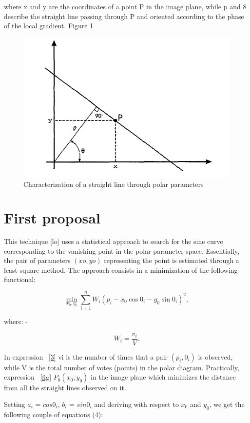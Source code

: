 \documentclass[12pt]{article}
\begin{document}
\raggedright where x and y are the coordinates of a point P in the image plane, while p and 8 describe the straight line passing through P and oriented according to the phase of the local gradient. Figure 
\ref{label1}
\noindent

\begin{figure}
    \centering
    \includegraphics[width=0.75\linewidth]{image1.png}
    \caption{Characterization of a straight line through polar parameters}
    \label{label1}
\end{figure}



\newpage
\section {First proposal}

\raggedright This technique [lo] uses a statistical approach to search for the sine curve corresponding to the vanishing point in the polar parameter space. Essentially, the pair of parameters $(xo, yo)$ representing the point is estimated through a least square method. The approach consists in a minimization of the following functional:
\noindent

\begin{equation}\label{fig}
\min_{x_0,y_0} ⁡\sum^n_{i=1} W_i  (p_i-x_0  \cos⁡0_i-y_0  \sin⁡{0_i})^2,
\end{equation}

\raggedright where:
\noindent
-

\begin{equation}\label{3}
W_i=\frac{v_i}{V}.
\end{equation}

\raggedright In expression ~\eqref{3} vi is the number of times that a pair $(p_i,0_i)$ is observed, while V is the total number of votes (points) in the polar diagram. Practically, expression  ~\eqref{fig} $P_0(x_0, y_0)$ in the image plane which minimizes the distance from all the straight lines observed on it.
\noindent
\newline
\raggedright Setting $a_i$ = $cos⁡{0_i}$, $b_i$ = $sin{0_i}$ and deriving with respect to $x_0$ and $y_0$, we get the following couple of equations (4\label{sum}):
\noindent
\end{document}
